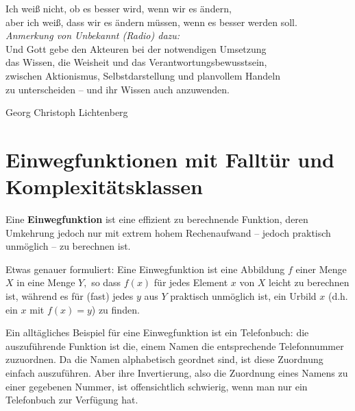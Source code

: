 \begin{refsegment}
\begin{ctsquote}
   Ich weiß nicht, ob es besser wird, wenn wir es ändern,\\
   aber ich weiß, dass wir es ändern müssen, wenn es besser werden soll.\\
   {\em Anmerkung von Unbekannt (Radio) dazu:}\\
   Und Gott gebe den Akteuren bei der notwendigen Umsetzung\\
   das Wissen, die Weisheit und das Verantwortungsbewusstsein,\\
   zwischen Aktionismus, Selbstdarstellung und planvollem Handeln\\
   zu unterscheiden -- und ihr Wissen auch anzuwenden.
\caption[Georg Christoph Lichtenberg]{Georg Christoph Lichtenberg\footnotemark}
\end{ctsquote}

\hypertarget{OneWayFunktion1}{}
\section{Einwegfunktionen mit Falltür und Komplexitätsklassen}
\label{OneWayFunktion1}
 
Eine \textbf{Einwegfunktion} ist eine effizient zu
berechnende Funktion, deren Umkehrung jedoch nur mit
extrem hohem Rechenaufwand -- jedoch praktisch unmöglich -- zu berechnen ist.\par

Etwas genauer formuliert:  Eine Einwegfunktion ist eine Abbildung $ f $ einer Menge $ X $ in eine Menge $ Y, $ so dass $ f(x) $ für jedes Element $ x $ von $ X $ leicht zu berechnen ist, während es für (fast) jedes $ y $ aus $ Y $  praktisch unmöglich ist, ein Urbild $ x $ (d.h. ein $ x $ mit $ f(x)=y $) zu finden.\par

Ein alltägliches Beispiel für eine Einwegfunktion ist ein Telefonbuch: die auszuführende Funktion ist die, einem Namen die entsprechende Telefonnummer zuzuordnen. Da die Namen alphabetisch geordnet sind, ist diese Zuordnung einfach auszuführen. Aber ihre Invertierung, also die Zuordnung eines Namens zu einer gegebenen Nummer, ist offensichtlich schwierig, wenn man nur ein Telefonbuch zur Verfügung hat. \par


\end{refsegment}
